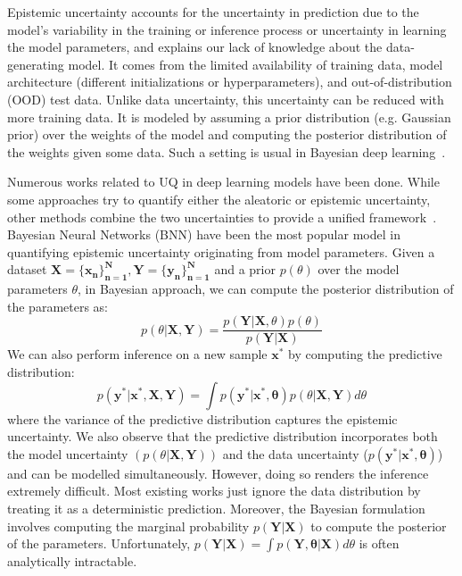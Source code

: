 Epistemic uncertainty accounts for the uncertainty in prediction due to the model's variability in the training or inference process or uncertainty in learning the model parameters, and explains our lack of knowledge about the data-generating model. It comes from the limited availability of training data, model architecture (different initializations or hyperparameters), and out-of-distribution (OOD) test data. Unlike data uncertainty, this uncertainty can be reduced with more training data. It is modeled by assuming a prior distribution (e.g. Gaussian prior) over the weights of the model and computing the posterior distribution of the weights given some data. Such a setting is usual in Bayesian deep learning~\cite{UncertDeepL2, BayesNN}. 

Numerous works related to UQ in deep learning models have been done. While some approaches try to quantify either the aleatoric or epistemic uncertainty, other methods combine the two uncertainties to provide a unified framework~\cite{UncertDeepL, UncertDeepL2, UncertDeepNNSurvey}. Bayesian Neural Networks (BNN) have been the most popular model in quantifying epistemic uncertainty originating from model parameters. Given a dataset $\mathbf{X=\{x_n\}_{n=1}^N, Y=\{y_n\}_{n=1}^N}$ and a prior $p(\theta)$ over the model parameters $\theta$, in Bayesian approach, we can compute the posterior distribution of the parameters as: 
\begin{equation}\label{postdist}
    p(\theta|\mathbf{X, Y}) = \frac{p(\mathbf{Y|X}, \theta) p(\theta)}{p(\mathbf{Y|X})}
\end{equation}
We can also perform inference on a new sample $\mathbf{x^*}$ by computing the predictive distribution: 
\begin{equation}\label{preddist}
    p(\mathbf{y^*|x^*, X, Y}) = \int p(\mathbf{y^*|x^*, \theta}) p(\theta|\mathbf{X, Y})d\theta
\end{equation}
where the variance of the predictive distribution captures the epistemic uncertainty. We also observe that the predictive distribution incorporates both the model uncertainty $(p(\theta|\mathbf{X, Y}))$ and the data uncertainty ($p(\mathbf{y^*|x^*, \theta})$) and can be modelled simultaneously. However, doing so renders the inference extremely difficult. Most existing works just ignore the data distribution by treating it as a deterministic prediction. Moreover, the Bayesian formulation involves computing the marginal probability $p(\mathbf{Y|X})$ to compute the posterior of the parameters. Unfortunately, $p(\mathbf{Y|X}) = \int p(\mathbf{Y, \theta|X}) d\theta$ is often analytically intractable. 

